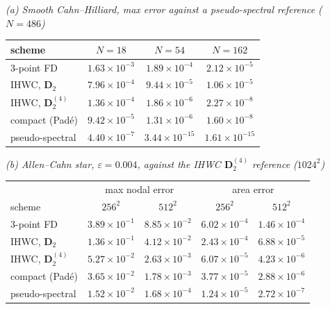 \textit{(a) Smooth Cahn--Hilliard, max error against a pseudo-spectral reference ($N=486$)}\\[2pt]
\begin{tabular}{l ccc}
\toprule
scheme & $N=18$ & $N=54$ & $N=162$\\
\midrule
3-point FD & $1.63{\times}10^{-3}$ & $1.89{\times}10^{-4}$ & $2.12{\times}10^{-5}$\\
IHWC, $\mathbf D_2$ & $7.96{\times}10^{-4}$ & $9.44{\times}10^{-5}$ & $1.06{\times}10^{-5}$\\
IHWC, $\mathbf D_2^{(4)}$ & $1.36{\times}10^{-4}$ & $1.86{\times}10^{-6}$ & $2.27{\times}10^{-8}$\\
compact (Pad\'e) & $9.42{\times}10^{-5}$ & $1.31{\times}10^{-6}$ & $1.60{\times}10^{-8}$\\
pseudo-spectral & $4.40{\times}10^{-7}$ & $3.44{\times}10^{-15}$ & $1.61{\times}10^{-15}$\\
\bottomrule
\end{tabular}

\medskip
\textit{(b) Allen--Cahn star, $\varepsilon=0.004$, against the IHWC $\mathbf D_2^{(4)}$ reference ($1024^2$)}\\[2pt]
\begin{tabular}{l cc cc}
\toprule
& \multicolumn{2}{c}{max nodal error} & \multicolumn{2}{c}{area error}\\
scheme & $256^2$ & $512^2$ & $256^2$ & $512^2$\\
\midrule
3-point FD & $3.89{\times}10^{-1}$ & $8.85{\times}10^{-2}$ & $6.02{\times}10^{-4}$ & $1.46{\times}10^{-4}$\\
IHWC, $\mathbf D_2$ & $1.36{\times}10^{-1}$ & $4.12{\times}10^{-2}$ & $2.43{\times}10^{-4}$ & $6.88{\times}10^{-5}$\\
IHWC, $\mathbf D_2^{(4)}$ & $5.27{\times}10^{-2}$ & $2.63{\times}10^{-3}$ & $6.07{\times}10^{-5}$ & $4.23{\times}10^{-6}$\\
compact (Pad\'e) & $3.65{\times}10^{-2}$ & $1.78{\times}10^{-3}$ & $3.77{\times}10^{-5}$ & $2.88{\times}10^{-6}$\\
pseudo-spectral & $1.52{\times}10^{-2}$ & $1.68{\times}10^{-4}$ & $1.24{\times}10^{-5}$ & $2.72{\times}10^{-7}$\\
\bottomrule
\end{tabular}
